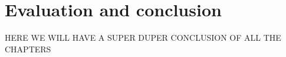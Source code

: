 \section{Evaluation and conclusion}

HERE WE WILL HAVE A SUPER DUPER CONCLUSION OF ALL THE CHAPTERS

